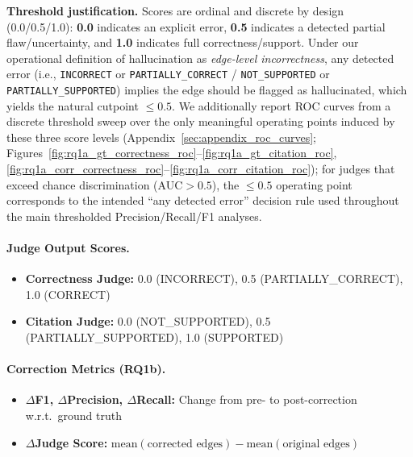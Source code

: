 \noindent\textbf{Threshold justification.} Scores are ordinal and discrete by design (0.0/0.5/1.0): \textbf{0.0} indicates an explicit error, \textbf{0.5} indicates a detected partial flaw/uncertainty, and \textbf{1.0} indicates full correctness/support. Under our operational definition of hallucination as \emph{edge-level incorrectness}, any detected error (i.e., \texttt{INCORRECT} or \texttt{PARTIALLY\_CORRECT} / \texttt{NOT\_SUPPORTED} or \texttt{PARTIALLY\_SUPPORTED}) implies the edge should be flagged as hallucinated, which yields the natural cutpoint \(\le 0.5\). We additionally report ROC curves from a discrete threshold sweep over the only meaningful operating points induced by these three score levels (Appendix~\ref{sec:appendix_roc_curves}; Figures~\ref{fig:rq1a_gt_correctness_roc}--\ref{fig:rq1a_gt_citation_roc}, \ref{fig:rq1a_corr_correctness_roc}--\ref{fig:rq1a_corr_citation_roc}); for judges that exceed chance discrimination (AUC$>0.5$), the \(\le 0.5\) operating point corresponds to the intended ``any detected error'' decision rule used throughout the main thresholded Precision/Recall/F1 analyses.

\paragraph{Judge Output Scores.}
\begin{itemize}[noitemsep]
    \item \textbf{Correctness Judge:} 0.0 (INCORRECT), 0.5 (PARTIALLY\_CORRECT), 1.0 (CORRECT)
    \item \textbf{Citation Judge:} 0.0 (NOT\_SUPPORTED), 0.5 (PARTIALLY\_SUPPORTED), 1.0 (SUPPORTED)
\end{itemize}

\paragraph{Correction Metrics (RQ1b).}
\begin{itemize}[noitemsep]
    \item \textbf{$\Delta$F1, $\Delta$Precision, $\Delta$Recall:} Change from pre- to post-correction w.r.t.\ ground truth
    \item \textbf{$\Delta$Judge Score:} $\text{mean}(\text{corrected edges}) - \text{mean}(\text{original edges})$
\end{itemize}

